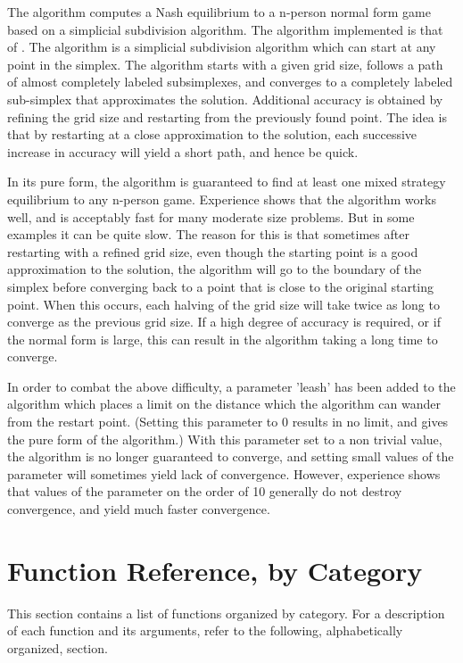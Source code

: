 The  algorithm computes a Nash equilibrium to a
n-person normal form game based on a simplicial subdivision algorithm.
The algorithm implemented is that of \cite{VTH:1987}.  The algorithm
is a simplicial subdivision algorithm which can start at any point in
the simplex.  The algorithm starts with a given grid size, follows a
path of almost completely labeled subsimplexes, and converges to a
completely labeled sub-simplex that approximates the solution.
Additional accuracy is obtained by refining the grid size and
restarting from the previously found point.  The idea is that by
restarting at a close approximation to the solution, each successive
increase in accuracy will yield a short path, and hence be quick.

In its pure form, the algorithm is guaranteed to find at least one
mixed strategy equilibrium to any n-person game.  Experience shows
that the algorithm works well, and is acceptably fast for many
moderate size problems.  But in some examples it can be quite slow.
The reason for this is that sometimes after restarting with a refined
grid size, even though the starting point is a good approximation to
the solution, the algorithm will go to the boundary of the simplex
before converging back to a point that is close to the original
starting point.  When this occurs, each halving of the grid size will
take twice as long to converge as the previous grid size.  If a high
degree of accuracy is required, or if the normal form is large, this
can result in the algorithm taking a long time to converge.

In order to combat the above difficulty, a parameter 'leash' has been
added to the algorithm which places a limit on the distance which the
algorithm can wander from the restart point. (Setting this parameter
to 0 results in no limit, and gives the pure form of the algorithm.)
With this parameter set to a non trivial value, the algorithm is no
longer guaranteed to converge, and setting small values of the
parameter will sometimes yield lack of convergence.  However,
experience shows that values of the parameter on the order of 10
generally do not destroy convergence, and yield much faster
convergence.

\chapter{Function Reference, by Category}

This section contains a list of functions organized by
category.  For a description of each function and its arguments,
refer to the following, alphabetically organized, section.  

